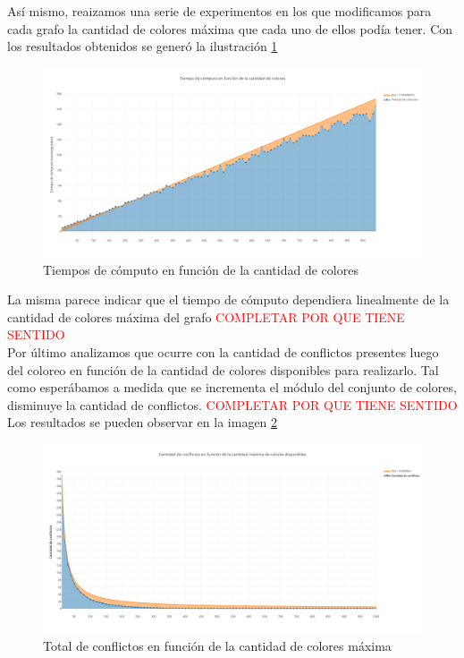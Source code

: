Así mismo, reaizamos una serie de experimentos en los que modificamos para cada grafo la cantidad de colores máxima que cada uno de ellos podía tener. Con los resultados obtenidos se generó la ilustración \ref{colorestiempo}

 \begin{figure}[H]
    \begin{center}
  	\includegraphics[width=18cm]{imagenes/ej3/colorestiempo.png}
 	\caption{Tiempos de cómputo en función de la cantidad de colores}
 	\label{colorestiempo}
    \end{center}
  \end{figure}

La misma parece indicar que el tiempo de cómputo dependiera linealmente de la cantidad de colores máxima del grafo \textcolor{red}{COMPLETAR POR QUE TIENE SENTIDO}\\

Por último analizamos que ocurre con la cantidad de conflictos presentes luego del coloreo en función de la cantidad de colores disponibles para realizarlo. Tal como esperábamos a medida que se incrementa el módulo del conjunto de colores, disminuye la cantidad de conflictos. \textcolor{red}{COMPLETAR POR QUE TIENE SENTIDO}\\ 
Los resultados se pueden observar en la imagen \ref{coloresconflicto}


 \begin{figure}[H]
    \begin{center}
  	\includegraphics[width=18cm]{imagenes/ej3/coloresconflicto.png}
 	\caption{Total de conflictos en función de la cantidad de colores máxima}
 	\label{coloresconflicto}
    \end{center}
  \end{figure}

